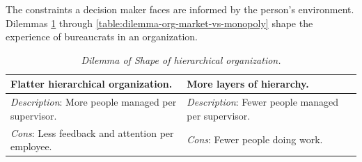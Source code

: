 The constraints a decision maker faces are informed by the person's environment. Dilemmas \ref{table:dilemma-org-people-per-supervisor} through \ref{table:dilemma-org-market-vs-monopoly} shape the experience of bureaucrats in an organization.

\begin{center}
\begin{table}[H] %
\begin{tabular}{ | m{\dilemmatablewidth}| m{\dilemmatablewidth} | } 
  \hline
  \textbf{Flatter hierarchical organization.} &
  \textbf{More layers of hierarchy.} \\ 
  \hline
  \textit{Description}: More people managed per supervisor. & 
  \textit{Description}: Fewer people managed per supervisor. \\ 
  \hline
  \textit{Cons}: Less feedback and attention per employee. & 
  \textit{Cons}: Fewer people doing work. \\  
  \hline
\end{tabular}
\caption{
\textit{Dilemma of Shape of hierarchical organization.}
}
\label{table:dilemma-org-people-per-supervisor}
\end{table}
\end{center}




